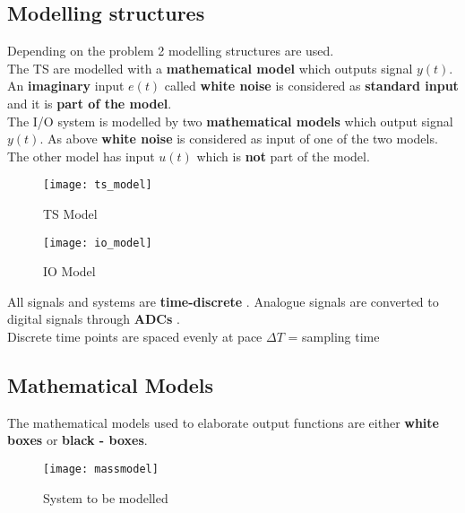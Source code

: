 
\subsection{Modelling structures}
Depending on the problem 2 modelling structures are used.\\
The TS are modelled with a \textbf{mathematical model} which outputs signal
$y(t)$. An \textbf{imaginary} input $ e(t) $ called \textbf{white noise} is considered as \textbf{standard input} and it is \textbf{part of the model}.\\
The I/O system is modelled by two \textbf{mathematical models} which output signal $ y(t) $.  As above \textbf{white noise} is considered as input of one of the two models. The other model has input $ u(t) $ which is \textbf{not} part of the model.\\

\begin{figure}[!h]
\begin{minipage}{.5\textwidth}
  \centering
  \texttt{[image: ts\_model]}
  \caption{TS Model}
\end{minipage}%
  \begin{minipage}{.5\textwidth}
  \centering
  \texttt{[image: io\_model]}
  \caption{IO Model}
\end{minipage}%
\end{figure}

All signals and systems are \textbf{time-discrete} . Analogue signals are converted to digital signals through \textbf{ADCs} . \\Discrete time points are spaced evenly at pace $ \Delta T $ = sampling time

\newpage
\subsection{Mathematical Models}
The mathematical models used to elaborate output functions are either \textbf{white boxes} or \textbf{black - boxes}.
\begin{figure}[!h]
  \centering
  \texttt{[image: massmodel]}
  \caption{System to be modelled}
\end{figure}


